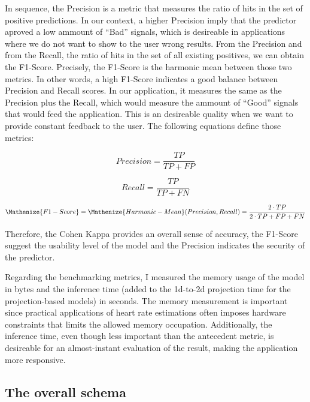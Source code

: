 In sequence, the Precision is a metric that measures the ratio of hits in the set of positive predictions. In our context, a higher Precision imply that the predictor aproved a low ammount of ``Bad'' signals, which is desireable in applications where we do not want to show to the user wrong results. From the Precision and from the Recall, the ratio of hits in the set of all existing positives, we can obtain the F1-Score. Precisely, the F1-Score is the harmonic mean between those two metrics. In other words, a high F1-Score indicates a good balance between Precision and Recall scores. In our application, it measures the same as the Precision plus the Recall, which would measure the ammount of ``Good'' signals that would feed the application. This is an desireable quality when we want to provide constant feedback to the user. The following equations define those metrics:

\begin{equation} \label{eq:Precision}
Precision = \frac{TP}{TP+FP}
\end{equation}


\begin{equation} \label{eq:Recall}
Recall = \frac{TP}{TP+FN}
\end{equation}

\begin{equation} \label{eq:F1-Score}
\Mathenize{F1-Score}  = \Mathenize{Harmonic-Mean}(Precision,Recall) = \frac{2 \cdot TP}{2 \cdot TP + FP + FN}
\end{equation}

\noindent Therefore, the Cohen Kappa provides an overall sense of accuracy, the F1-Score suggest the usability level of the model and the Precision indicates the security of the predictor. 

Regarding the benchmarking metrics, I measured the memory usage of the model in bytes and the inference time (added to the 1d-to-2d projection time for the projection-based models) in seconds. The memory measurement is important since practical applications of heart rate estimations often imposes hardware constraints that limits the allowed memory occupation. Additionally, the inference time, even though less important than the antecedent metric, is desireable for an almost-instant evaluation of the result, making the application more responsive.

\subsection{The overall schema}

